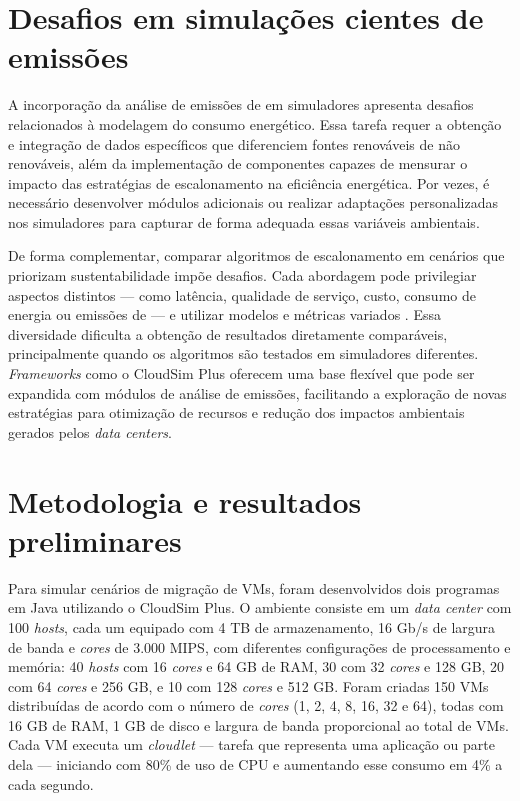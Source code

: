 \documentclass[12pt]{article}
\begin{document}
\section{Desafios em simulações cientes de emissões}
A incorporação da análise de emissões de  em simuladores apresenta desafios relacionados à modelagem do consumo energético. Essa tarefa requer a obtenção e integração de dados específicos que diferenciem fontes renováveis de não renováveis, além da implementação de componentes capazes de mensurar o impacto das estratégias de escalonamento na eficiência energética. Por vezes, é necessário desenvolver módulos adicionais ou realizar adaptações personalizadas nos simuladores para capturar de forma adequada essas variáveis ambientais.

De forma complementar, comparar algoritmos de escalonamento em cenários que priorizam sustentabilidade impõe desafios. Cada abordagem pode privilegiar aspectos distintos --- como latência, qualidade de serviço, custo, consumo de energia ou emissões de  --- e utilizar modelos e métricas variados \cite{kumar:19}. Essa diversidade dificulta a obtenção de resultados diretamente comparáveis, principalmente quando os algoritmos são testados em simuladores diferentes. \textit{Frameworks} como o CloudSim Plus \cite{silva:17} oferecem uma base flexível que pode ser expandida com módulos de análise de emissões, facilitando a exploração de novas estratégias para otimização de recursos e redução dos impactos ambientais gerados pelos \textit{data centers}.

\section{Metodologia e resultados preliminares}

Para simular cenários de migração de VMs, foram desenvolvidos dois programas em Java utilizando o CloudSim Plus. O ambiente consiste em um \textit{data center} com 100 \textit{hosts}, cada um equipado com 4 TB de armazenamento, 16 Gb/s de largura de banda e \textit{cores} de 3.000 MIPS, com diferentes configurações de processamento e memória: 40 \textit{hosts} com 16 \textit{cores} e 64 GB de RAM, 30 com 32 \textit{cores} e 128 GB, 20 com 64 \textit{cores} e 256 GB, e 10 com 128 \textit{cores} e 512 GB. Foram criadas 150 VMs distribuídas de acordo com o número de \textit{cores} (1, 2, 4, 8, 16, 32 e 64), todas com 16 GB de RAM, 1 GB de disco e largura de banda proporcional ao total de VMs. Cada VM executa um \textit{cloudlet} --- tarefa que representa uma aplicação ou parte dela --- iniciando com 80\% de uso de CPU e aumentando esse consumo em 4\% a cada segundo.
\end{document}
